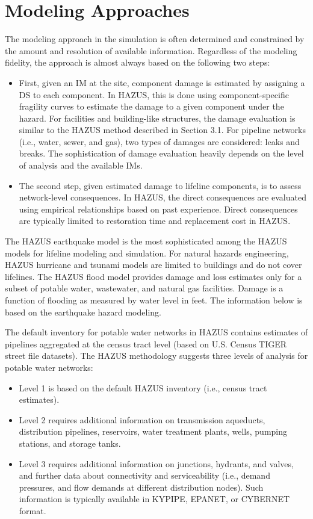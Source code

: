 \section{Modeling Approaches}
\label{sec:perf_pipeline_methods}

The modeling approach in the simulation is often determined and constrained by the amount and resolution of available information. Regardless of the modeling fidelity, the approach is almost always based on the following two steps: 

\begin{itemize}
    \item First, given an IM at the site, component damage is estimated by assigning a DS to each component. In HAZUS, this is done using component-specific fragility curves to estimate the damage to a given component under the hazard. For facilities and building-like structures, the damage evaluation is similar to the HAZUS method described in Section 3.1. For pipeline networks (i.e., water, sewer, and gas), two types of damages are considered: leaks and breaks. The sophistication of damage evaluation heavily depends on the level of analysis and the available IMs. 
    \item The second step, given estimated damage to lifeline components, is to assess network-level consequences. In HAZUS, the direct consequences are evaluated using empirical relationships based on past experience. Direct consequences are typically limited to restoration time and replacement cost in HAZUS.
\end{itemize}

The HAZUS earthquake model is the most sophisticated among the HAZUS models for lifeline modeling and simulation. For natural hazards engineering, HAZUS hurricane and tsunami models are limited to buildings and do not cover lifelines. The HAZUS flood model provides damage and loss estimates only for a subset of potable water, wastewater, and natural gas facilities. Damage is a function of flooding as measured by water level in feet. The information below is based on the earthquake hazard modeling.

The default inventory for potable water networks in HAZUS contains estimates of pipelines aggregated at the census tract level (based on U.S. Census TIGER street file datasets). The HAZUS methodology suggests three levels of analysis for potable water networks:

\begin{itemize}
    \item Level 1 is based on the default HAZUS inventory (i.e., census tract estimates).
    \item Level 2 requires additional information on transmission aqueducts, distribution pipelines, reservoirs, water treatment plants, wells, pumping stations, and storage tanks. 
    \item Level 3 requires additional information on junctions, hydrants, and valves, and further data about connectivity and serviceability (i.e., demand pressures, and flow demands at different distribution nodes). Such information is typically available in KYPIPE, EPANET, or CYBERNET format.
\end{itemize}

